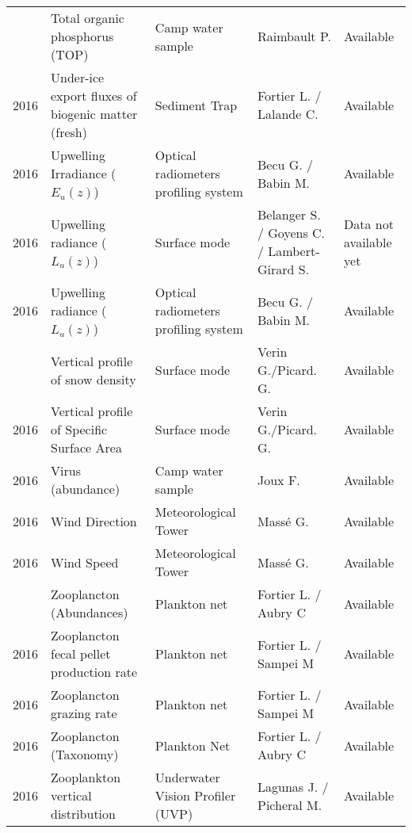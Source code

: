 \documentclass[]{article}
\begin{document}
\begin{landscape}
\begin{longtable}{rllll}
\addlinespace
2016 & Total organic phosphorus (TOP) & Camp water sample & Raimbault P. & Available\\
2016 & Under-ice export fluxes of biogenic matter (fresh) & Sediment Trap & Fortier L. / Lalande C. & Available\\
2016 & Upwelling Irradiance ($E_u(z)$) & Optical radiometers profiling system & Becu G. / Babin M. & Available\\
2016 & Upwelling radiance ($L_u(z)$) & Surface mode & Belanger S. / Goyens C. / Lambert-Girard S. & Data not available yet\\
2016 & Upwelling radiance ($L_u(z)$) & Optical radiometers profiling system & Becu G. / Babin M. & Available\\
\addlinespace
2016 & Vertical profile of snow density & Surface mode & Verin G./Picard. G. & Available\\
2016 & Vertical profile of Specific Surface Area & Surface mode & Verin G./Picard. G. & Available\\
2016 & Virus (abundance) & Camp water sample & Joux F. & Available\\
2016 & Wind Direction & Meteorological Tower & Massé G. & Available\\
2016 & Wind Speed & Meteorological Tower & Massé G. & Available\\
\addlinespace
2016 & Zooplancton (Abundances) & Plankton net & Fortier L. / Aubry C & Available\\
2016 & Zooplancton fecal pellet production rate & Plankton net & Fortier L. / Sampei M & Available\\
2016 & Zooplancton grazing rate & Plankton net & Fortier L. / Sampei M & Available\\
2016 & Zooplancton (Taxonomy) & Plankton Net & Fortier L. / Aubry C & Available\\
2016 & Zooplankton vertical distribution & Underwater Vision Profiler (UVP) & Lagunas J. / Picheral M. & Available\\*
\end{longtable}
\endgroup{}
\end{landscape}
\end{document}
